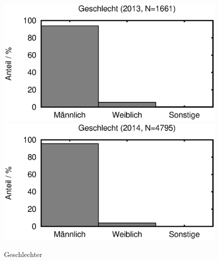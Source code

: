 \documentclass[11pt]{scrartcl}
\begin{document}
\begin{figure}[htbp]
   \centering
   \includegraphics[width=0.8\linewidth]{2013/geschlecht-rel}\\
   \includegraphics[width=0.8\linewidth]{2014/geschlecht-rel}
   \caption{Geschlechter}
   \label{fig:geschlecht}
\end{figure}

\clearpage
{}

\end{document}
